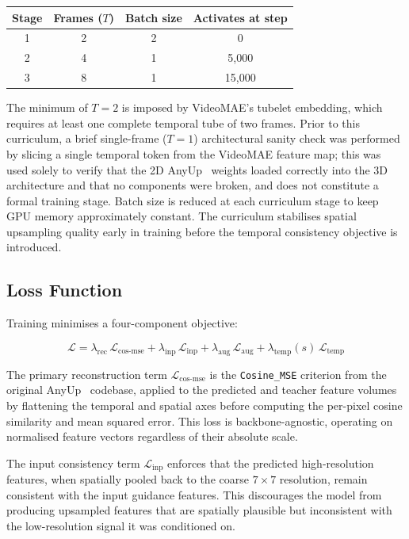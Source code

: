 \begin{center}
\begin{tabular}{cccc}
\toprule
Stage & Frames ($T$) & Batch size & Activates at step \\
\midrule
1 & 2 & 2 & 0      \\
2 & 4 & 1 & 5{,}000  \\
3 & 8 & 1 & 15{,}000 \\
\bottomrule
\end{tabular}
\end{center}

The minimum of $T=2$ is imposed by VideoMAE's tubelet embedding, which requires at least one complete temporal tube of two frames. Prior to this curriculum, a brief single-frame ($T=1$) architectural sanity check was performed by slicing a single temporal token from the VideoMAE feature map; this was used solely to verify that the 2D AnyUp~\cite{anyup} weights loaded correctly into the 3D architecture and that no components were broken, and does not constitute a formal training stage. Batch size is reduced at each curriculum stage to keep GPU memory approximately constant. The curriculum stabilises spatial upsampling quality early in training before the temporal consistency objective is introduced.

\subsection{Loss Function}
\label{sec:losses}
Training minimises a four-component objective:

\begin{equation}
\mathcal{L} = \lambda_{\mathrm{rec}}\,\mathcal{L}_{\mathrm{cos\text{-}mse}}
            + \lambda_{\mathrm{inp}}\,\mathcal{L}_{\mathrm{inp}}
            + \lambda_{\mathrm{aug}}\,\mathcal{L}_{\mathrm{aug}}
            + \lambda_{\mathrm{temp}}(s)\,\mathcal{L}_{\mathrm{temp}}
\end{equation}

\noindent The primary reconstruction term $\mathcal{L}_{\mathrm{cos\text{-}mse}}$ is the \texttt{Cosine\_MSE} criterion from the original AnyUp~\cite{anyup} codebase, applied to the predicted and teacher feature volumes by flattening the temporal and spatial axes before computing the per-pixel cosine similarity and mean squared error. This loss is backbone-agnostic, operating on normalised feature vectors regardless of their absolute scale.

The input consistency term $\mathcal{L}_{\mathrm{inp}}$ enforces that the predicted high-resolution features, when spatially pooled back to the coarse $7{\times}7$ resolution, remain consistent with the input guidance features. This discourages the model from producing upsampled features that are spatially plausible but inconsistent with the low-resolution signal it was conditioned on.

